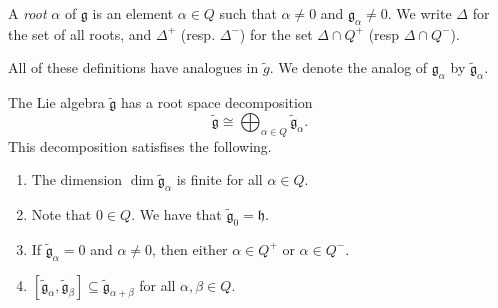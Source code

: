 \documentclass[11pt, letterpaper]{article}
\theoremstyle{plain}
\begin{document}
\begin{definition}\label{dfn:3-8}
	A \emph{root} $\alpha $ of $\mathfrak{g} $ is an element $\alpha \in Q$ such that $\alpha \neq 0$ and $\mathfrak{g} _{\alpha } \neq 0$. We write $\Delta $ for the set of all roots, and $\Delta ^+$ (resp. $\Delta ^-$) for the set $\Delta  \cap Q^+$ (resp $\Delta  \cap Q^-$).
\end{definition}


All of these definitions have analogues in $\widetilde{g} $. We denote the analog of $\mathfrak{g} _\alpha $ by $\widetilde{\mathfrak{g} }_\alpha $.

\begin{lemma}\label{lma:3-9}
	The Lie algebra $\widetilde{\mathfrak{g} } $ has a root space decomposition
	\[
		\widetilde{\mathfrak{g} } \cong \bigoplus_{\alpha \in Q} \widetilde{\mathfrak{g} }_\alpha 
	.\]
	This decomposition satisfises the following.
	\begin{enumerate}[align=right, label=(\arabic*)]
		\item The dimension $\dim \widetilde{\mathfrak{g} }_{\alpha } $ is finite for all $\alpha \in Q$.
		\item Note that $0\in Q$. We have that $\widetilde{\mathfrak{g} }_0=\mathfrak{h} $.
		\item If $\widetilde{\mathfrak{g} }_\alpha =0$ and $\alpha \neq 0$, then either $\alpha \in Q^+$ or $\alpha \in Q^-$.
		\item $[\widetilde{\mathfrak{g} }_\alpha ,\widetilde{\mathfrak{g} }_\beta ]\subseteq \widetilde{\mathfrak{g} }_{\alpha +\beta } $ for all $\alpha ,\beta \in Q$.
	\end{enumerate}
\end{lemma}
\end{document}
